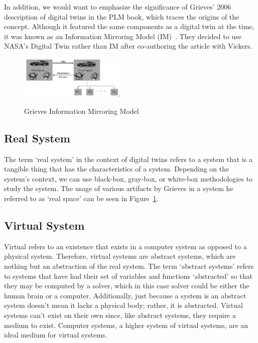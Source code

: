 \documentclass[9pt,conference]{IEEEtran}
\begin{document}
    In addition, we would want to emphasize the significance of Grieves' 2006 description of digital twins in the PLM book,
    which traces the origins of the concept. Although it featured the same components as a digital twin at the time, it was known as an Information Mirroring Model (IM)~\cite{GrievesPLMBook}. 
    They decided to use NASA's Digital Twin rather than IM after co-authoring the article with Vickers.

    \begin{figure}
        \centering
        \includegraphics[width =0.45\textwidth]{GrievesInformationMirroringModel.png}
        \caption{Grieves Information Mirroring Model}
        \label{fig:GrievesInformationMirroringModel}
        \cite{GrievesPLMBook}
    \end{figure}

    \subsection*{Real System}

    The term `real system' in the context of digital twins refers to a system that is a tangible thing that has the characteristics of a system. Depending on the system's context, we can use black-box, gray-box, or white-box methodologies to study the system. 
    The usage of various artifacts by Grieves in a system he referred to as `real space' can be seen in Figure~\ref{fig:GrievesInformationMirroringModel}.

    \subsection*{Virtual System}
    Virtual refers to an existence that exists in a computer system as opposed to a physical system. Therefore, virtual systems are abstract systems, which are nothing but an abstraction of the real system.
    The term `abstract systems' refers to systems that have had their set of variables and functions `abstracted' so that they may be computed by a solver, which in this case solver could be either the human brain or a computer.
    Additionally, just because a system is an abstract system doesn't mean it lacks a physical body; rather, it is abstracted. 
    Virtual systems can't exist on their own since, like abstract systems, they require a medium to exist. Computer systems, a higher system of virtual systems, are an ideal medium for virtual systems.
    
\end{document}
